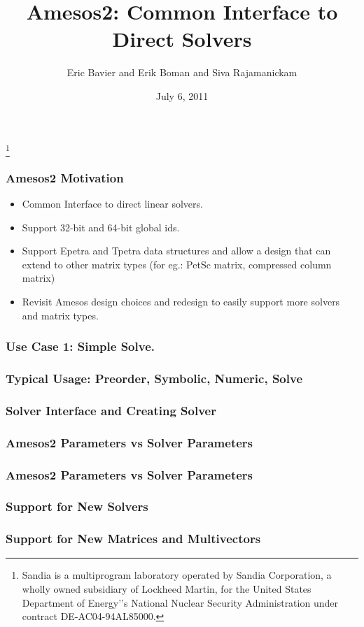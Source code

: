 \documentclass[xcolor=dvipsnames]{beamer}
\title[Amesos2]{Amesos2: Common Interface to Direct Solvers}
\author[Bavier, Boman, Rajamanickam]{Eric Bavier and Erik Boman and Siva Rajamanickam}
\institute[]{
Sandia National Laboratories
}
\date[]{July 6, 2011}
\begin{document}
\begin{frame}[plain]
    \titlepage
\footnote{\tiny{Sandia is a multiprogram laboratory operated by Sandia Corporation, a wholly owned subsidiary of Lockheed Martin, for the United States Department of Energy'’s National Nuclear Security Administration under contract DE-AC04-94AL85000.}}
\end{frame}

\begin{frame}
    \frametitle{Amesos2 Motivation}

\begin{itemize}
\item Common Interface to direct linear solvers.
\medskip
\item Support 32-bit and 64-bit global ids.
\medskip
\item Support Epetra and Tpetra data structures and allow a design that can
      extend to other matrix types (for eg.: PetSc matrix, compressed column
       matrix)
\medskip
\item Revisit Amesos design choices and redesign to easily support more
      solvers and matrix types.
\end{itemize}

\end{frame}

\begin{frame}
    \frametitle{Use Case 1: Simple Solve.}
\end{frame}

\begin{frame}
    \frametitle{Typical Usage: Preorder, Symbolic, Numeric, Solve}
\end{frame}

\begin{frame}
    \frametitle{Solver Interface and Creating Solver}
\end{frame}

\begin{frame}
    \frametitle{Amesos2 Parameters vs Solver Parameters}
\end{frame}

\begin{frame}
    \frametitle{Amesos2 Parameters vs Solver Parameters}
\end{frame}

\begin{frame}
    \frametitle{Support for New Solvers}
\end{frame}

\begin{frame}
    \frametitle{Support for New Matrices and Multivectors}
\end{frame}
\end{document}
